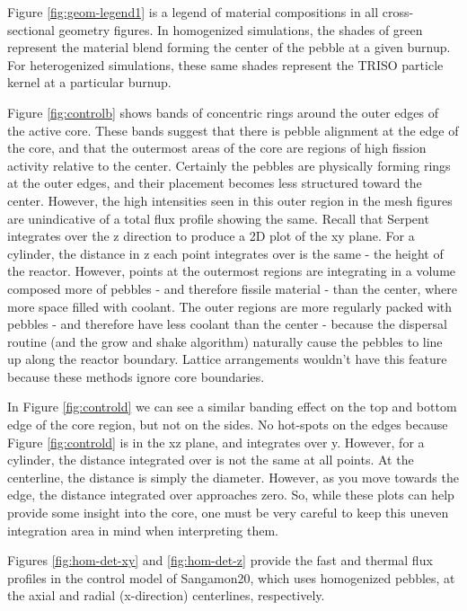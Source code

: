 Figure \ref{fig:geom-legend1} is a legend of material compositions in all cross-sectional geometry figures.  In homogenized simulations, the shades of green represent the material blend forming the center of the pebble at a given burnup.  For heterogenized simulations, these same shades represent the TRISO particle kernel at a particular burnup.



Figure \ref{fig:controlb} shows bands of concentric rings around the outer edges of the active core.  These bands suggest that there is pebble alignment at the edge of the core, and that the outermost areas of the core are regions of high fission activity relative to the center.  Certainly the pebbles are physically forming rings at the outer edges, and their placement becomes less structured toward the center.  However, the high intensities seen in this outer region in the mesh figures are unindicative of a total flux profile showing the same.  Recall that Serpent integrates over the z direction to produce a 2D plot of the xy plane.  For a cylinder, the distance in z each point integrates over is the same - the height of the reactor.  However, points at the outermost regions are integrating in a volume composed more of pebbles - and therefore fissile material - than the center, where more space filled with coolant.  The outer regions are more regularly packed with pebbles - and therefore have less coolant than the center - because the dispersal routine (and the grow and shake algorithm) naturally cause the pebbles to line up along the reactor boundary.  Lattice arrangements wouldn't have this feature because these methods ignore core boundaries.

In Figure \ref{fig:controld} we can see a similar banding effect on the top and bottom edge of the core region, but not on the sides.  No hot-spots on the edges because Figure \ref{fig:controld} is in the xz plane, and integrates over y.  However, for a cylinder, the distance integrated over is not the same at all points.  At the centerline, the distance is simply the diameter.  However, as you move towards the edge, the distance integrated over approaches zero.  So, while these plots can help provide some insight into the core, one must be very careful to keep this uneven integration area in mind when interpreting them.

Figures \ref{fig:hom-det-xy} and \ref{fig:hom-det-z} provide the fast and thermal flux profiles in the control model of Sangamon20, which uses homogenized pebbles, at the axial and radial (x-direction) centerlines, respectively.

